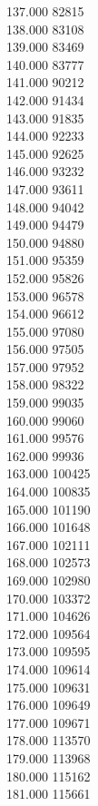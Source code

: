 { 137.000	82815 \\
 138.000	83108 \\
 139.000	83469 \\
 140.000	83777 \\
 141.000	90212 \\
 142.000	91434 \\
 143.000	91835 \\
 144.000	92233 \\
 145.000	92625 \\
 146.000	93232 \\
 147.000	93611 \\
 148.000	94042 \\
 149.000	94479 \\
 150.000	94880 \\
 151.000	95359 \\
 152.000	95826 \\
 153.000	96578 \\
 154.000	96612 \\
 155.000	97080 \\
 156.000	97505 \\
 157.000	97952 \\
 158.000	98322 \\
 159.000	99035 \\
 160.000	99060 \\
 161.000	99576 \\
 162.000	99936 \\
 163.000	100425 \\
 164.000	100835 \\
 165.000	101190 \\
 166.000	101648 \\
 167.000	102111 \\
 168.000	102573 \\
 169.000	102980 \\
 170.000	103372 \\
 171.000	104626 \\
 172.000	109564 \\
 173.000	109595 \\
 174.000	109614 \\
 175.000	109631 \\
 176.000	109649 \\
 177.000	109671 \\
 178.000	113570 \\
 179.000	113968 \\
 180.000	115162 \\
 181.000	115661 \\
}
